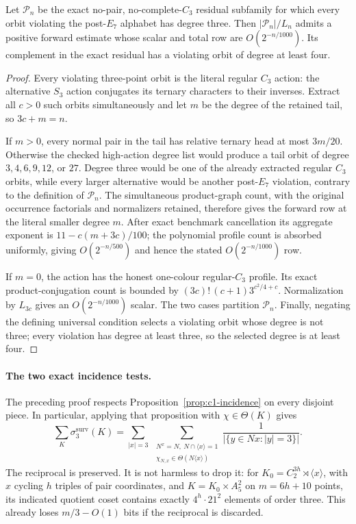 \begin{theorem}
\label{thm:complete-degree-three-packet}
Let $\mathcal P_n$ be the exact no-pair, no-complete-$C_3$ residual
subfamily for which every orbit violating the post-$E_7$ alphabet has
degree three.  Then $|\mathcal P_n|/L_n$ admits a positive forward
estimate whose scalar and total row are $O(2^{-n/1000})$.
Its complement in the exact residual has a violating orbit of degree at
least four.
\end{theorem}
\begin{proof}
Every violating three-point orbit is the literal regular $C_3$ action:
the alternative $S_3$ action conjugates its ternary characters to their
inverses.  Extract all $c>0$ such orbits simultaneously and let $m$ be
the degree of the retained tail, so $3c+m=n$.

If $m>0$, every normal pair in the tail has relative ternary head at
most $3m/20$.  Otherwise the checked high-action degree list would
produce a tail orbit of degree $3,4,6,9,12$, or $27$.  Degree three
would be one of the already extracted regular $C_3$ orbits, while every
larger alternative would be another post-$E_7$ violation, contrary to
the definition of $\mathcal P_n$.  The simultaneous product-graph
count, with the original occurrence factorials and normalizers retained,
therefore gives the forward row at the literal smaller degree $m$.
After exact benchmark cancellation its aggregate exponent is
$11-c(m+3c)/100$; the polynomial profile count is absorbed uniformly,
giving $O(2^{-n/500})$ and hence the stated $O(2^{-n/1000})$ row.

If $m=0$, the action has the honest one-colour regular-$C_3$ profile.
Its exact product-conjugation count is bounded by
$(3c)!\,(c+1)3^{c^2/4+c}$.  Normalization by $L_{3c}$ gives an
$O(2^{-n/1000})$ scalar.  The two cases partition $\mathcal P_n$.
Finally, negating the defining universal condition selects a violating
orbit whose degree is not three; every violation has degree at least
three, so the selected degree is at least four.
\end{proof}

\paragraph{The two exact incidence tests.}
The preceding proof respects Proposition~\ref{prop:c1-incidence} on
every disjoint piece. In particular, applying that proposition with
$\chi\in\Theta(K)$ gives
\[
 \sum_K\sigma^{\mathrm{surv}}_3(K)
 =\sum_{|x|=3}\ 
 \sum_{\substack{N^x=N,\ N\cap\langle x\rangle=1\\
        \chi_{N,x}\in\Theta(N\langle x\rangle)}}
 \frac1{|\{y\in Nx:|y|=3\}|}.
\]
The reciprocal is preserved. It is not harmless to drop it: for
$K_0=C_2^{3h}\rtimes\langle x\rangle$, with $x$ cycling $h$
triples of pair coordinates, and $K=K_0\times A_5^2$ on
$m=6h+10$ points, its indicated quotient coset contains exactly
$4^h\cdot21^2$ elements of order three. This already loses
$m/3-O(1)$ bits if the reciprocal is discarded.


